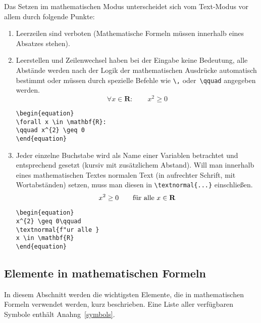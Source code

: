Das Setzen im mathematischen Modus unterscheidet sich vom
Text-Modus vor allem durch folgende Punkte:
\begin{enumerate}
\item Leerzeilen sind verboten (Mathematische Formeln müssen
  innerhalb eines Absatzes stehen).

\item Leerstellen und Zeilenwechsel haben bei der Eingabe keine
  Bedeutung, alle Abstände werden nach der Logik der
  mathematischen Ausdrücke automatisch bestimmt oder müssen
  durch spezielle Befehle wie \lstinline|\,| oder~\lstinline|\qquad|
  angegeben werden.
\exa
\begin{equation}
\forall x \in \mathbf{R}:
\qquad x^{2} \geq 0
\end{equation}
\exb
\begin{verbatim}
\begin{equation}
\forall x \in \mathbf{R}:
\qquad x^{2} \geq 0
\end{equation}
\end{verbatim}
\exc
 
\item Jeder einzelne Buchstabe wird als Name einer Variablen
  betrachtet und entsprechend gesetzt (kursiv mit
  zusätzlichem Abstand).  Will man innerhalb eines
  mathematischen Textes normalen Text (in aufrechter Schrift, mit
  Wortabständen) setzen, muss man diesen in
  \lstinline|\textnormal{...}| einschließen.
\exa
\begin{equation}
x^{2} \geq 0\qquad
\textnormal{für alle }
x \in \mathbf{R}
\end{equation}
\exb
\begin{verbatim}
\begin{equation}
x^{2} \geq 0\qquad
\textnormal{f"ur alle }
x \in \mathbf{R}
\end{equation}
\end{verbatim}
\exc
 
 
\end{enumerate}
 
\subsection{Elemente in mathematischen Formeln}
 
In diesem Abschnitt werden die wichtigsten Elemente, die in
mathematischen Formeln verwendet werden, kurz beschrieben.  Eine
Liste aller verfügbaren Symbole enthält
Anahng~\vref{symbols}.
 
\bigskip

